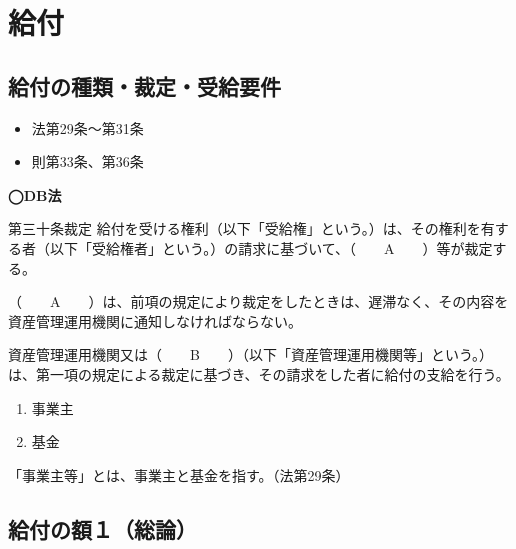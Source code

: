 \section{給付}

\subsection{給付の種類・裁定・受給要件}

\begin{InyouJobunbox}
  \begin{itemize}
    \item 法第29条〜第31条
    \item 則第33条、第36条
  \end{itemize}
\end{InyouJobunbox}

\begin{fillblank}[年金1 2023 問題1(1)アイ]
  \noindent \textbf{◯DB法}
  \begin{lawstructure}
    \begin{lawarticle}{第三十条}{裁定}
      給付を受ける権利（以下「受給権」という。）は、その権利を有する者（以下「受給権者」という。）の請求に基づいて、（　　A　　）等が裁定する。
      
      （　　A　　）は、前項の規定により裁定をしたときは、遅滞なく、その内容を資産管理運用機関に通知しなければならない。

      資産管理運用機関又は（　　B　　）（以下「資産管理運用機関等」という。）は、第一項の規定による裁定に基づき、その請求をした者に給付の支給を行う。
      
    \end{lawarticle}
  \end{lawstructure}
\end{fillblank}

\begin{answerbox}
  \begin{enumerate}[A:]
    \item 事業主
    \item 基金
  \end{enumerate}
\end{answerbox}

\begin{explanationbox}
  「事業主等」とは、事業主と基金を指す。（法第29条）
\end{explanationbox}

\newpage

\subsection{給付の額１（総論）}

